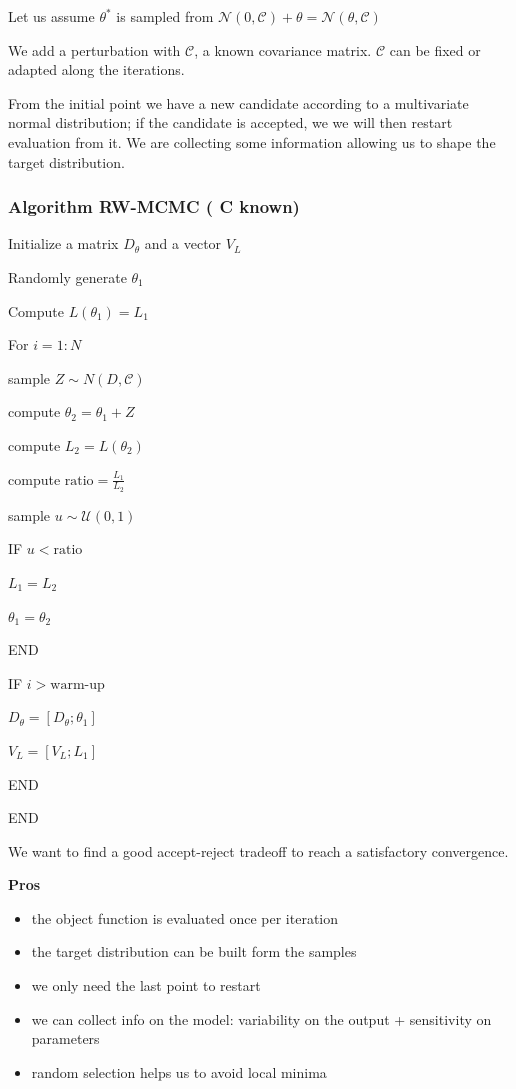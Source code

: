 Let us assume $\theta^*$ is sampled from
$\mathcal{N}(0,\mathcal{C})+\theta=\mathcal{N}(\theta,\mathcal{C})$

We add a perturbation with $\mathcal{C}$, a known covariance matrix.
$\mathcal{C}$ can be fixed or adapted along the iterations.

From the initial point we have a new candidate according to a
multivariate normal distribution; if the candidate is accepted, we we
will then restart evaluation from it. We are collecting some information
allowing us to shape the target distribution.

\hypertarget{algorithm-rw-mcmc-c-known}{%
\subsubsection{Algorithm RW-MCMC ( C
known)}\label{algorithm-rw-mcmc-c-known}}

Initialize a matrix $D_\theta$ and a vector $V_L$

Randomly generate $\theta_1$

Compute $L(\theta_1)=L_1$

For $i=1:N$

sample $Z \sim N(D,\mathcal{C})$

compute $\theta_2=\theta_1+Z$

compute $L_2=L(\theta_2)$

compute $\text{ratio}=\frac{L_1}{L_2}$

sample $u \sim\mathcal{U}(0,1)$

IF $u < \text{ratio}$

$L_1=L_2$

$\theta_1=\theta_2$

END

IF $i > \text{warm-up}$

$D_\theta=[D_\theta;\theta_1]$

$V_L=[V_L;L_1]$

END

END

We want to find a good accept-reject tradeoff to reach a satisfactory
convergence.

\textbf{Pros}

\begin{itemize}
\tightlist
\item
  the object function is evaluated once per iteration
\item
  the target distribution can be built form the samples
\item
  we only need the last point to restart
\item
  we can collect info on the model: variability on the output +
  sensitivity on parameters
\item
  random selection helps us to avoid local minima
\end{itemize}

